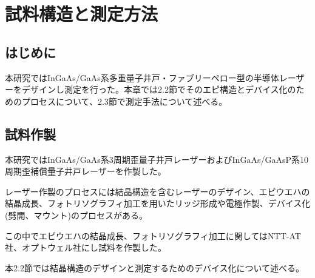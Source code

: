 
\chapter{試料構造と測定方法}%
\section{はじめに}%
本研究ではInGaAs/GaAs系多重量子井戸・ファブリーペロー型の半導体レーザーをデザインし測定を行った。本章では2.2節でそのエピ構造とデバイス化のためのプロセスについて、2.3節で測定手法について述べる。
\section{試料作製}%
本研究ではInGaAs/GaAs系3周期歪量子井戸レーザーおよびInGaAs/GaAsP系10周期歪補償量子井戸レーザーを作製した。

レーザー作製のプロセスには結晶構造を含むレーザーのデザイン、エピウエハの結晶成長、フォトリソグラフィ加工を用いたリッジ形成や電極作製、デバイス化(劈開、マウント)のプロセスがある。



この中でエピウエハの結晶成長、フォトリソグラフィ加工に関してはNTT-AT社、オプトウェル社にし試料を作製した。

本2.2節では結晶構造のデザインと測定するためのデバイス化について述べる。

